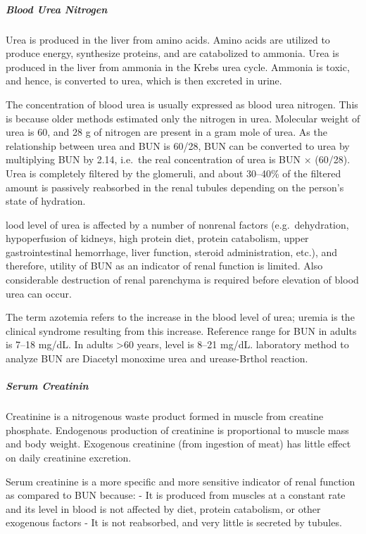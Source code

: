 \documentclass[
  letterpaper,
  DIV=11,
  numbers=noendperiod]{scrreprt}
\let\oldsubparagraph\subparagraph
\renewcommand{\subparagraph}[1]{\oldsubparagraph{#1}\mbox{}}
\begin{document}
\subparagraph{Blood Urea Nitrogen}\label{blood-urea-nitrogen}

Urea is produced in the liver from amino acids. Amino acids are utilized
to produce energy, synthesize proteins, and are catabolized to ammonia.
Urea is produced in the liver from ammonia in the Krebs urea cycle.
Ammonia is toxic, and hence, is converted to urea, which is then
excreted in urine.

The concentration of blood urea is usually expressed as blood urea
nitrogen. This is because older methods estimated only the nitrogen in
urea. Molecular weight of urea is 60, and 28 g of nitrogen are present
in a gram mole of urea. As the relationship between urea and BUN is
60/28, BUN can be converted to urea by multiplying BUN by 2.14, i.e.~the
real concentration of urea is BUN × (60/28). Urea is completely filtered
by the glomeruli, and about 30--40\% of the filtered amount is passively
reabsorbed in the renal tubules depending on the person's state of
hydration.

lood level of urea is affected by a number of nonrenal factors
(e.g.~dehydration, hypoperfusion of kidneys, high protein diet, protein
catabolism, upper gastrointestinal hemorrhage, liver function, steroid
administration, etc.), and therefore, utility of BUN as an indicator of
renal function is limited. Also considerable destruction of renal
parenchyma is required before elevation of blood urea can occur.

The term azotemia refers to the increase in the blood level of urea;
uremia is the clinical syndrome resulting from this increase. Reference
range for BUN in adults is 7--18 mg/dL. In adults \textgreater60 years,
level is 8--21 mg/dL. laboratory method to analyze BUN are Diacetyl
monoxime urea and urease-Brthol reaction.

\subparagraph{Serum Creatinin}\label{serum-creatinin}

Creatinine is a nitrogenous waste product formed in muscle from creatine
phosphate. Endogenous production of creatinine is proportional to muscle
mass and body weight. Exogenous creatinine (from ingestion of meat) has
little effect on daily creatinine excretion.

Serum creatinine is a more specific and more sensitive indicator of
renal function as compared to BUN because: - It is produced from muscles
at a constant rate and its level in blood is not affected by diet,
protein catabolism, or other exogenous factors - It is not reabsorbed,
and very little is secreted by tubules.
\end{document}
